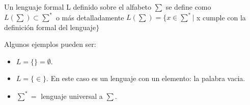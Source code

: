 Un lenguaje formal L definido sobre el alfabeto $\sum$ se define como $L(\sum) \subset \sum^*$ o más detalladamente $L(\sum) = \{x \in \sum^* |$ x cumple con la definición formal del lenguaje$\}$

Algunos ejemplos pueden ser:

\begin{itemize}

\item $L = \{\} = \emptyset$.
\item $L = \{\in\}$. En este caso es un lenguaje con un elemento: la palabra vacia.
\item $\sum^* =$ lenguaje universal a $\sum$.

\end{itemize}

